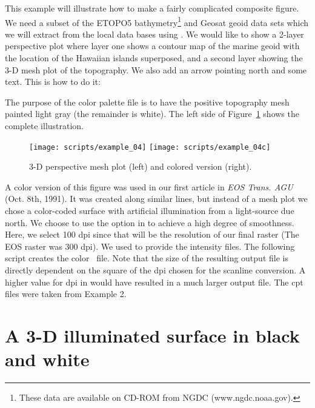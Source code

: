 This example will illustrate how to make a fairly complicated
composite figure.  We need a subset of the ETOPO5 bathymetry\footnote{
These data are available on CD-ROM from NGDC (www.ngdc.noaa.gov).}
and Geosat geoid data sets which we will extract from the local
data bases using .  We would like to show a
2-layer perspective plot where layer one shows a contour map
of the marine geoid with the location of the Hawaiian islands
superposed, and a second layer showing the 3-D mesh plot of
the topography.  We also add an arrow pointing north and some
text.  This is how to do it:


The purpose of the color palette file  is to have
the positive topography mesh painted light gray (the remainder
is white). The left side of Figure~\ref{fig:GMT_example_04} shows the complete illustration.

\begin{figure}[ht]
   \texttt{[image: scripts/example\_04]}\hfill
   \texttt{[image: scripts/example\_04c]}
   \caption{3-D perspective mesh plot (left) and colored version (right).}
   \label{fig:GMT_example_04}
\end{figure}

A color version of this figure was used in our first article in \emph{EOS
Trans. AGU} (Oct. 8th, 1991).  It was created along similar
lines, but instead of a mesh plot we chose a color-coded surface
with artificial illumination from a light-source due north.
We choose to use the  option in  to
achieve a high degree of smoothness.  Here, we select 100 dpi
since that will be the resolution of our final raster
(The EOS raster was 300 dpi). We used  to
provide the intensity files.  The following script creates
the color \PS\ file.  Note that the size of the
resulting output file is directly dependent on the square of
the dpi chosen for the scanline conversion.  A higher value
for dpi in  would have resulted in a much larger
output file.  The cpt files were taken from Example 2.



\section{A 3-D illuminated surface in black and white}

